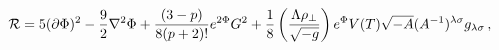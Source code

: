 \begin{equation}\label{R_identity}
{\cal R} = 5(\partial\Phi)^2 - {\frac{9}{2}}\nabla^2\Phi +
{\frac{(3-p)}{8(p+2)!}} e^{2\Phi}G^2 + {\frac{1}{8}}\left(
{\frac{\Lambda\rho_\perp}{\sqrt{-g}}} \right)
e^{\Phi}V(T)\sqrt{-A}(A^{-1})^{\lambda\sigma}g_{\lambda\sigma} \,
,
\end{equation}

